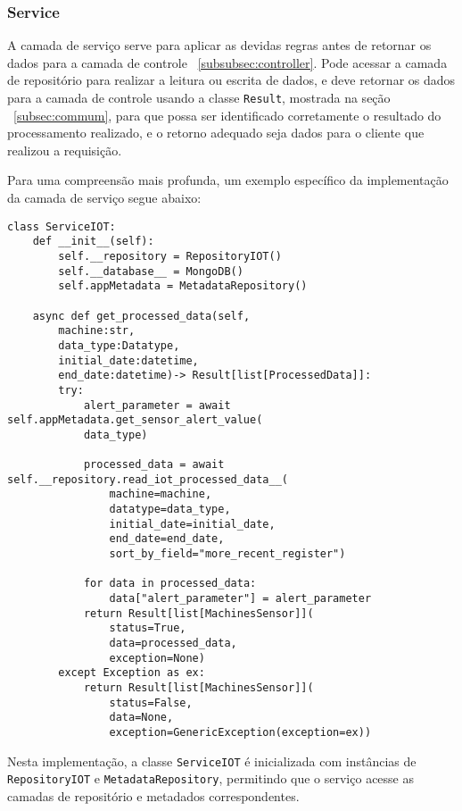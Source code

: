 \subsubsection{Service}\label{subsubsec:service}
A camada de serviço serve para aplicar as devidas regras antes de retornar os dados para a camada de controle ~\ref{subsubsec:controller}. Pode acessar a camada de repositório para realizar a leitura ou escrita de dados, e deve retornar os dados para a camada de controle usando a classe \texttt{Result}, mostrada na seção ~\ref{subsec:commum}, para que possa ser identificado corretamente o resultado do processamento realizado, e o retorno adequado seja dados para o cliente que realizou a requisição. 

Para uma compreensão mais profunda, um exemplo específico da implementação da camada de serviço segue abaixo:

\begin{verbatim}
class ServiceIOT:
    def __init__(self):
        self.__repository = RepositoryIOT()
        self.__database__ = MongoDB()
        self.appMetadata = MetadataRepository()
            
    async def get_processed_data(self,
        machine:str,
        data_type:Datatype,
        initial_date:datetime,
        end_date:datetime)-> Result[list[ProcessedData]]:
        try:
            alert_parameter = await self.appMetadata.get_sensor_alert_value(
            data_type)

            processed_data = await self.__repository.read_iot_processed_data__(
                machine=machine,
                datatype=data_type,
                initial_date=initial_date,
                end_date=end_date,
                sort_by_field="more_recent_register")
            
            for data in processed_data:
                data["alert_parameter"] = alert_parameter
            return Result[list[MachinesSensor]](
                status=True,
                data=processed_data,
                exception=None)
        except Exception as ex:
            return Result[list[MachinesSensor]](
                status=False,
                data=None,
                exception=GenericException(exception=ex))
\end{verbatim}

Nesta implementação, a classe \texttt{ServiceIOT} é inicializada com instâncias de \texttt{RepositoryIOT} e \texttt{MetadataRepository}, permitindo que o serviço acesse as camadas de repositório e metadados correspondentes.

